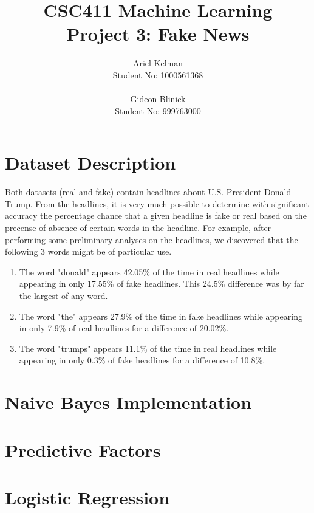 \documentclass{article}
\title{CSC411 Machine Learning \\ Project 3: Fake News}
\author{ Ariel Kelman \\ Student No: 1000561368
         \\ \\
         Gideon Blinick \\ Student No: 999763000 }
\begin{document}
   \maketitle{}


   \section{Dataset Description}

Both datasets (real and fake) contain headlines about U.S. President Donald Trump.
From the headlines, it is very much possible to determine with significant accuracy the percentage chance that a given headline
is fake or real based on the precense of absence of certain words in the headline.
For example, after performing some preliminary analyses on the headlines, we discovered that the following 3 words might be of particular use.
\begin{enumerate}
\item The word "donald" appears 42.05\% of the time in real headlines while appearing in only 17.55\% of fake headlines. This 24.5\% difference was by far the largest of any word.

\item The word "the" appears 27.9\% of the time in fake headlines while appearing in only 7.9\% of real headlines for a difference of 20.02\%.
\item The word "trumps" appears 11.1\% of the time in real headlines while appearing in only 0.3\% of fake headlines for a difference of 10.8\%.
\end{enumerate}






   \section{Naive Bayes Implementation}




   \section{Predictive Factors}




   \section{Logistic Regression}
\end{document}
